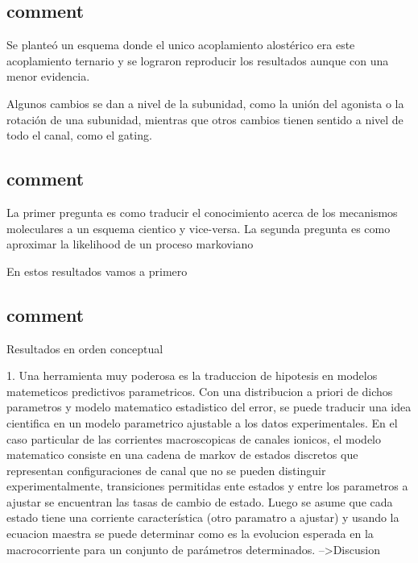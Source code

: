 \documentclass[a4paper,12pt]{article}
\begin{document}
	
	
	
	
	\subsection{comment}
		Se planteó un esquema donde el unico acoplamiento alostérico era este acoplamiento ternario y se lograron reproducir los resultados aunque con una menor evidencia. 
		
		Algunos cambios se dan a nivel de la subunidad, como la unión del agonista o la rotación de una subunidad, mientras que otros cambios tienen sentido a nivel de todo el canal, como el gating. 
		
	
	
	
	\subsection{comment}
		
		
		
		
		
		La primer pregunta es como traducir el conocimiento acerca de los mecanismos moleculares a  un esquema cientico y vice-versa. 
		La segunda pregunta es como aproximar la likelihood de un proceso markoviano
		
		
		En estos resultados vamos a primero      
		
		
		
	
	\subsection{comment}
		Resultados en orden conceptual
		
		
		1. Una herramienta muy poderosa es la traduccion de hipotesis en modelos matemeticos predictivos parametricos. Con una distribucion a priori de dichos parametros y modelo matematico estadistico del error, se puede traducir una idea cientifica en un modelo parametrico ajustable a los datos experimentales. 
		En el caso particular de las corrientes macroscopicas de canales ionicos, el modelo matematico consiste en una cadena de markov de estados discretos que representan configuraciones de canal que no se pueden distinguir experimentalmente, transiciones permitidas ente estados y entre los parametros a ajustar se encuentran las tasas de cambio de estado. Luego se asume que cada estado tiene una corriente característica (otro paramatro a ajustar) y usando la ecuacion maestra se puede determinar como es la evolucion esperada en la macrocorriente para un conjunto de parámetros determinados. -->Discusion
		
\end{document}
